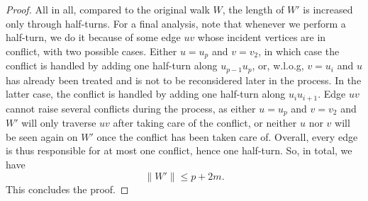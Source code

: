 \documentclass[a4paper,11pt,dvipsnames]{elsarticle}
\begin{document}
\begin{proof}

All in all, compared to the original walk $W$, the length of $W'$ is increased only through half-turns. For a final analysis, note that whenever we perform a half-turn, we do it because of some edge $uv$ whose incident vertices are in conflict, with two possible cases. Either $u=u_p$ and $v=v_2$, in which case the conflict is handled by adding one half-turn along $u_{p-1}u_p$, or, w.l.o.g, $v=u_i$ and $u$ has already been treated and is not to be reconsidered later in the process. In the latter case, the conflict is handled by adding one half-turn along $u_iu_{i+1}$. Edge $uv$ cannot raise several conflicts during the process, as either $u=u_p$ and $v=v_2$ and $W'$ will only traverse $uv$ after taking care of the conflict, or neither $u$ nor $v$ will be seen again on $W'$ once the conflict has been taken care of. Overall, every edge is thus responsible for at most one conflict, hence one half-turn. So, in total, we have $$\|W'\| \leq p+2m.$$ This concludes the proof.
\end{proof}

\end{document}
